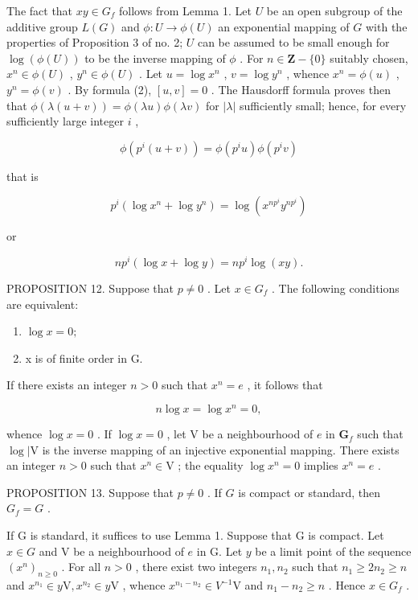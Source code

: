 The fact that \(xy \in G_f\) follows from Lemma 1. Let \(U\) be an open subgroup of the additive group \(L(G)\) and \(\phi: U \to \phi(U)\) an exponential mapping of \(G\) with the properties of Proposition 3 of no. 2; \(U\) can be assumed to be small enough for \(\log(\phi(U))\) to be the inverse mapping of \(\phi\) . For \(n \in \mathbf{Z} - \{0\}\) suitably chosen, \(x^n \in \phi(U)\) , \(y^n \in \phi(U)\) . Let \(u = \log x^n\) , \(v = \log y^n\) , whence \(x^n = \phi(u)\) , \(y^n = \phi(v)\) . By formula (2), \([u,v] = 0\) . The Hausdorff formula proves then that \(\phi(\lambda(u + v)) = \phi(\lambda u)\phi(\lambda v)\) for \(|\lambda|\) sufficiently small; hence, for every sufficiently large integer \(i\) ,

\[
\phi (p ^ {i} (u + v)) = \phi (p ^ {i} u) \phi (p ^ {i} v)
\]

that is

\[
p ^ {i} (\log x ^ {n} + \log y ^ {n}) = \log (x ^ {n p ^ {i}} y ^ {n p ^ {i}})
\]

or

\[
n p ^ {i} (\log x + \log y) = n p ^ {i} \log (x y).
\]

PROPOSITION 12. Suppose that \(p \neq 0\) . Let \(x \in G_f\) . The following conditions are equivalent:

\begin{enumerate}
\def\labelenumi{(\roman{enumi})}
\item
  \(\log x = 0;\)
\item
  x is of finite order in G.
\end{enumerate}

If there exists an integer \(n > 0\) such that \(x^n = e\) , it follows that

\[
n \log x = \log x ^ {n} = 0,
\]

whence \(\log x = 0\) . If \(\log x = 0\) , let \(\mathrm{V}\) be a neighbourhood of \(e\) in \(\mathbf{G}_f\) such that \(\log |\mathrm{V}\) is the inverse mapping of an injective exponential mapping. There exists an integer \(n > 0\) such that \(x^n \in \mathrm{V}\) ; the equality \(\log x^n = 0\) implies \(x^n = e\) .

PROPOSITION 13. Suppose that \(p \neq 0\) . If \(G\) is compact or standard, then \(G_f = G\) .

If G is standard, it suffices to use Lemma 1. Suppose that G is compact. Let \(x \in G\) and V be a neighbourhood of \(e\) in G. Let \(y\) be a limit point of the sequence \((x^n)_{n \geqslant 0}\) . For all \(n > 0\) , there exist two integers \(n_1, n_2\) such that \(n_1 \geqslant 2n_2 \geqslant n\) and \(x^{n_1} \in y\mathrm{V}, x^{n_2} \in y\mathrm{V}\) , whence \(x^{n_1 - n_2} \in V^{-1}\mathrm{V}\) and \(n_1 - n_2 \geqslant n\) . Hence \(x \in G_f\) .

